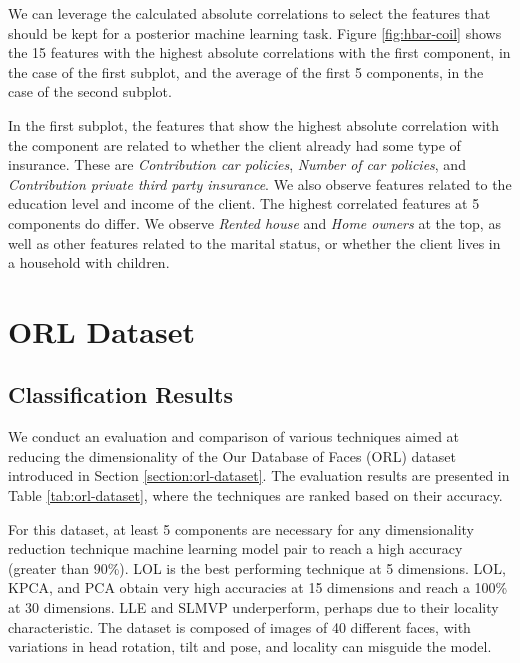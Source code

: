 We can leverage the calculated absolute correlations to select the features that should be kept for a posterior machine learning task. Figure \ref{fig:hbar-coil} shows the 15 features with the highest absolute correlations with the first component, in the case of the first subplot, and the average of the first 5 components, in the case of the second subplot.

In the first subplot, the features that show the highest absolute correlation with the component are related to whether the client already had some type of insurance. These are \textit{Contribution car policies}, \textit{Number of car policies}, and \textit{Contribution private third party insurance}. We also observe features related to the education level and income of the client.
The highest correlated features at 5 components do differ. We observe \textit{Rented house} and \textit{Home owners} at the top, as well as other features related to the marital status, or whether the client lives in a household with children.

\section{ORL Dataset}

\subsection{Classification Results}

We conduct an evaluation and comparison of various techniques aimed at reducing the dimensionality of the Our Database of Faces (ORL) dataset introduced in Section \ref{section:orl-dataset}. The evaluation results are presented in Table \ref{tab:orl-dataset}, where the techniques are ranked based on their accuracy.

For this dataset, at least 5 components are necessary for any dimensionality reduction technique machine learning model pair to reach a high accuracy (greater than 90\%). LOL is the best performing technique at 5 dimensions. LOL, KPCA, and PCA obtain very high accuracies at 15 dimensions and reach a 100\% at 30 dimensions. LLE and SLMVP underperform, perhaps due to their locality characteristic. The dataset is composed of images of 40 different faces, with variations in head rotation, tilt and pose, and locality can misguide the model.

